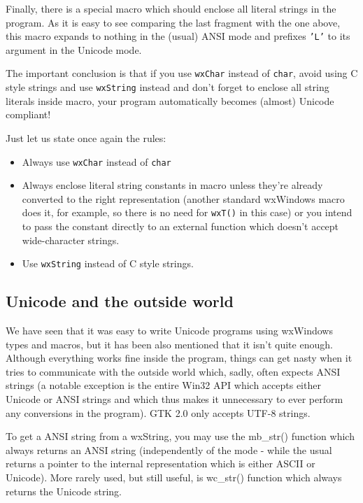 Finally, there is a special  macro which should enclose all
literal strings in the program. As it is easy to see comparing the last
fragment with the one above, this macro expands to nothing in the (usual) ANSI
mode and prefixes {\tt 'L'} to its argument in the Unicode mode.

The important conclusion is that if you use {\tt wxChar} instead of 
{\tt char}, avoid using C style strings and use {\tt wxString} instead and
don't forget to enclose all string literals inside  macro, your
program automatically becomes (almost) Unicode compliant!

Just let us state once again the rules:

\begin{itemize}
\item Always use {\tt wxChar} instead of {\tt char}
\item Always enclose literal string constants in  macro
unless they're already converted to the right representation (another standard
wxWindows macro  does it, for example, so there is no
need for {\tt wxT()} in this case) or you intend to pass the constant directly
to an external function which doesn't accept wide-character strings.
\item Use {\tt wxString} instead of C style strings.
\end{itemize}

\subsection{Unicode and the outside world}

We have seen that it was easy to write Unicode programs using wxWindows types
and macros, but it has been also mentioned that it isn't quite enough.
Although everything works fine inside the program, things can get nasty when
it tries to communicate with the outside world which, sadly, often expects
ANSI strings (a notable exception is the entire Win32 API which accepts either
Unicode or ANSI strings and which thus makes it unnecessary to ever perform
any conversions in the program). GTK 2.0 only accepts UTF-8 strings.

To get a ANSI string from a wxString, you may use the 
mb\_str() function which always returns an ANSI
string (independently of the mode - while the usual 
 returns a pointer to the internal
representation which is either ASCII or Unicode). More rarely used, but still
useful, is wc\_str() function which always returns
the Unicode string.

